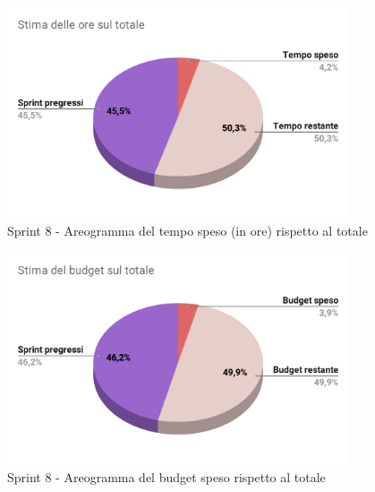   \begin{figure}[H]
    \centering
    \includegraphics[width=0.90\textwidth]{assets/Consuntivo/Sprint-8/copertura_oraria.pdf}
    \caption{Sprint 8 - Areogramma del tempo speso (in ore) rispetto al totale}
  \end{figure}

  \begin{figure}[H]
    \centering
    \includegraphics[width=0.90\textwidth]{assets/Consuntivo/Sprint-8/budget_speso.pdf}
    \caption{Sprint 8 - Areogramma del budget speso rispetto al totale}
  \end{figure}

